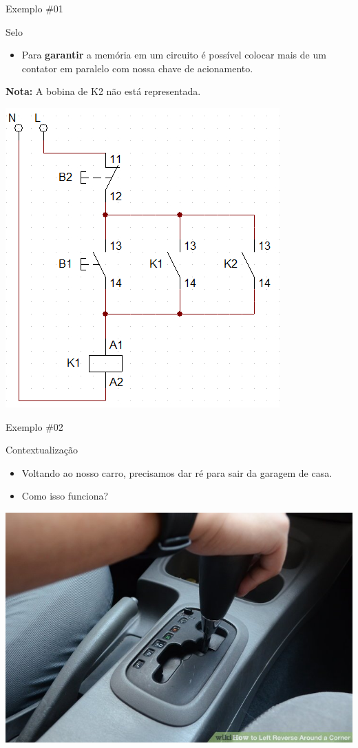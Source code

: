 \begin{frame}{Exemplo \#01}
\begin{block}{Selo}
\begin{itemize}
    \item Para \textbf{garantir} a memória em um circuito é possível colocar mais de um contator em paralelo com nossa chave de acionamento.
\end{itemize}
 \textbf{Nota:} A bobina de K2 não está representada.
\end{block}

\centerline{\includegraphics[height=0.55\textheight]{Figuras/Ch07/fig4.jpg}}
\end{frame}


\begin{frame}{Exemplo \#02}
\begin{block}{Contextualização}
\begin{itemize}
    \item Voltando ao nosso carro, precisamos dar ré para sair da garagem de casa.
    \item Como isso funciona?
\end{itemize}
\end{block}

\centerline{\includegraphics[width=0.65\linewidth]{Figuras/Ch07/fig5.jpg}}
\end{frame}


